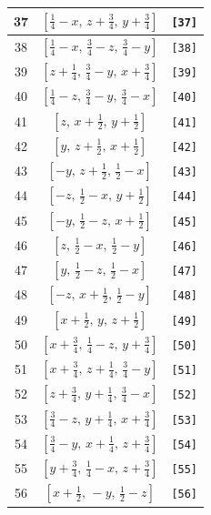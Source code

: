 \documentclass[fleqn,8pt]{jsarticle}
\begin{document}
\begin{longtable}{ccc}
37 & $\left[ \frac{1}{4} - x,\, z + \frac{3}{4},\, y + \frac{3}{4} \right]$ & {\tt [37]} \\ \hline
38 & $\left[ \frac{1}{4} - x,\, \frac{3}{4} - z,\, \frac{3}{4} - y \right]$ & {\tt [38]} \\ \hline
39 & $\left[ z + \frac{1}{4},\, \frac{3}{4} - y,\, x + \frac{3}{4} \right]$ & {\tt [39]} \\ \hline
40 & $\left[ \frac{1}{4} - z,\, \frac{3}{4} - y,\, \frac{3}{4} - x \right]$ & {\tt [40]} \\ \hline
41 & $\left[ z,\, x + \frac{1}{2},\, y + \frac{1}{2} \right]$ & {\tt [41]} \\ \hline
42 & $\left[ y,\, z + \frac{1}{2},\, x + \frac{1}{2} \right]$ & {\tt [42]} \\ \hline
43 & $\left[ - y,\, z + \frac{1}{2},\, \frac{1}{2} - x \right]$ & {\tt [43]} \\ \hline
44 & $\left[ - z,\, \frac{1}{2} - x,\, y + \frac{1}{2} \right]$ & {\tt [44]} \\ \hline
45 & $\left[ - y,\, \frac{1}{2} - z,\, x + \frac{1}{2} \right]$ & {\tt [45]} \\ \hline
46 & $\left[ z,\, \frac{1}{2} - x,\, \frac{1}{2} - y \right]$ & {\tt [46]} \\ \hline
47 & $\left[ y,\, \frac{1}{2} - z,\, \frac{1}{2} - x \right]$ & {\tt [47]} \\ \hline
48 & $\left[ - z,\, x + \frac{1}{2},\, \frac{1}{2} - y \right]$ & {\tt [48]} \\ \hline
49 & $\left[ x + \frac{1}{2},\, y,\, z + \frac{1}{2} \right]$ & {\tt [49]} \\ \hline
50 & $\left[ x + \frac{3}{4},\, \frac{1}{4} - z,\, y + \frac{3}{4} \right]$ & {\tt [50]} \\ \hline
51 & $\left[ x + \frac{3}{4},\, z + \frac{1}{4},\, \frac{3}{4} - y \right]$ & {\tt [51]} \\ \hline
52 & $\left[ z + \frac{3}{4},\, y + \frac{1}{4},\, \frac{3}{4} - x \right]$ & {\tt [52]} \\ \hline
53 & $\left[ \frac{3}{4} - z,\, y + \frac{1}{4},\, x + \frac{3}{4} \right]$ & {\tt [53]} \\ \hline
54 & $\left[ \frac{3}{4} - y,\, x + \frac{1}{4},\, z + \frac{3}{4} \right]$ & {\tt [54]} \\ \hline
55 & $\left[ y + \frac{3}{4},\, \frac{1}{4} - x,\, z + \frac{3}{4} \right]$ & {\tt [55]} \\ \hline
56 & $\left[ x + \frac{1}{2},\, - y,\, \frac{1}{2} - z \right]$ & {\tt [56]} \\ \hline

\end{longtable}
\end{document}
